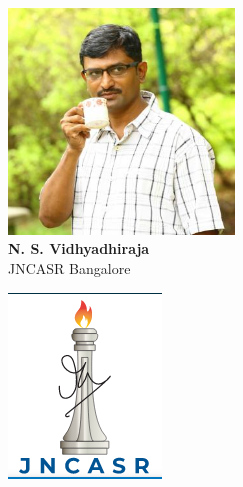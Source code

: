 \documentclass[aspectratio=169]{beamer}
\begin{document}
\begin{frame}{}
\begin{minipage}{0.3\textwidth}
	\centering
	\includegraphics[width=0.45\textwidth]{nsv.jpeg}\\
	\footnotesize{{\bf N. S. Vidhyadhiraja}\\
	JNCASR Bangalore}
\end{minipage}
\hspace*{\fill}
\begin{minipage}{0.1\textwidth}
	\includegraphics[width=\textwidth]{JNCASR.png}\\
\end{minipage}
\hspace*{\fill}

\end{frame}
\end{document}
